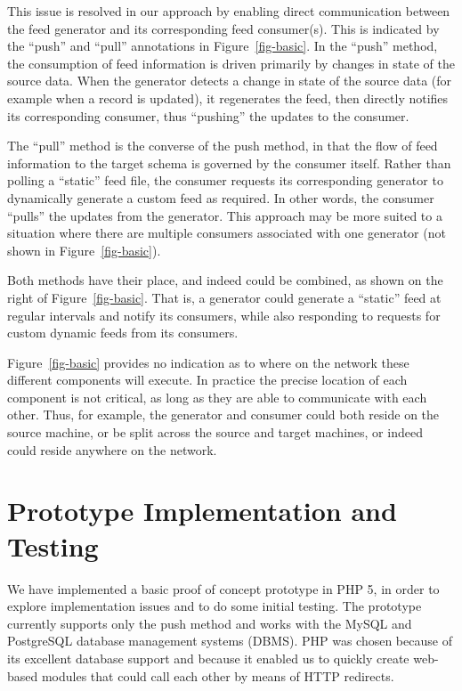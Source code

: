 \documentclass{CRPITStyle}
\begin{document}
This issue is resolved in our approach by enabling direct communication
between the feed generator and its corresponding feed consumer(s). This
is indicated by the ``push'' and ``pull'' annotations in
Figure~\ref{fig-basic}. In the ``push'' method, the consumption of feed
information is driven primarily by changes in state of the source data.
When the generator detects a change in state of the source data (for
example when a record is updated), it regenerates the feed, then
directly notifies its corresponding consumer, thus ``pushing'' the
updates to the consumer.

The ``pull'' method is the converse of the push method, in that the flow
of feed information to the target schema is governed by the consumer
itself. Rather than polling a ``static'' feed file, the consumer
requests its corresponding generator to dynamically generate a custom
feed as required. In other words, the consumer ``pulls'' the updates
from the generator. This approach may be more suited to a situation
where there are multiple consumers associated with one generator (not
shown in Figure~\ref{fig-basic}).

Both methods have their place, and indeed could be combined, as shown on
the right of Figure~\ref{fig-basic}. That is, a generator could generate
a ``static'' feed at regular intervals and notify its consumers, while
also responding to requests for custom dynamic feeds from its consumers.

Figure~\ref{fig-basic} provides no indication as to where on the network
these different components will execute. In practice the precise
location of each component is not critical, as long as they are able to
communicate with each other. Thus, for example, the generator and
consumer could both reside on the source machine, or be split across the
source and target machines, or indeed could reside anywhere on the
network.


\section{Prototype Implementation and Testing}
\label{sec-prototype}

We have implemented a basic proof of concept prototype in PHP 5, in
order to explore implementation issues and to do some initial testing.
The prototype currently supports only the push method and works with the
MySQL and PostgreSQL database management systems (DBMS). PHP was chosen
because of its excellent database support and because it enabled us to
quickly create web-based modules that could call each other by means of
HTTP redirects.
\end{document}
